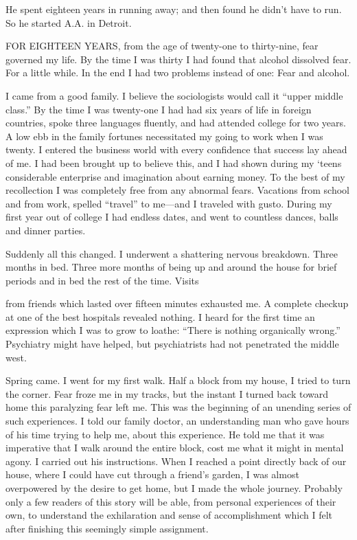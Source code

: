 

\bbChapterPreamble




\begin{biblechapter}
    He spent eighteen years in running away; 
    and then found he didn’t have to run.
\verse So he started A.A. in Detroit.
\end{biblechapter}


\begin{biblechapter}
    FOR EIGHTEEN YEARS, from the age of twenty-one to thirty-nine, fear governed my life. By the time I was thirty I had found that alcohol dissolved fear. For a little while. In the end I had two problems instead of one: Fear and alcohol.

I came from a good family. I believe the sociologists would call it “upper middle class.” By the time I was twenty-one I had had six years of life in foreign countries, spoke three languages fluently, and had attended college for two years. A low ebb in the family fortunes necessitated my going to work when I was twenty. I entered the business world with every confidence that success lay ahead of me. I had been brought up to believe this, and I had shown during my ‘teens considerable enterprise and imagination about earning money. To the best of my recollection I was completely free from any abnormal fears. Vacations from school and from work, spelled “travel” to me—and I traveled with gusto. During my first year out of college I had endless dates, and went to countless dances, balls and dinner parties.

Suddenly all this changed. I underwent a shattering nervous breakdown. Three months in bed. Three more months of being up and around the house for brief periods and in bed the rest of the time. Visits

from friends which lasted over fifteen minutes exhausted me. A complete checkup at one of the best hospitals revealed nothing. I heard for the first time an expression which I was to grow to loathe: “There is nothing organically wrong.” Psychiatry might have helped, but psychiatrists had not penetrated the middle west.

Spring came. I went for my first walk. Half a block from my house, I tried to turn the corner. Fear froze me in my tracks, but the instant I turned back toward home this paralyzing fear left me. This was the beginning of an unending series of such experiences. I told our family doctor, an understanding man who gave hours of his time trying to help me, about this experience. He told me that it was imperative that I walk around the entire block, cost me what it might in mental agony. I carried out his instructions. When I reached a point directly back of our house, where I could have cut through a friend’s garden, I was almost overpowered by the desire to get home, but I made the whole journey. Probably only a few readers of this story will be able, from personal experiences of their own, to understand the exhilaration and sense of accomplishment which I felt after finishing this seemingly simple assignment.


\end{biblechapter}
